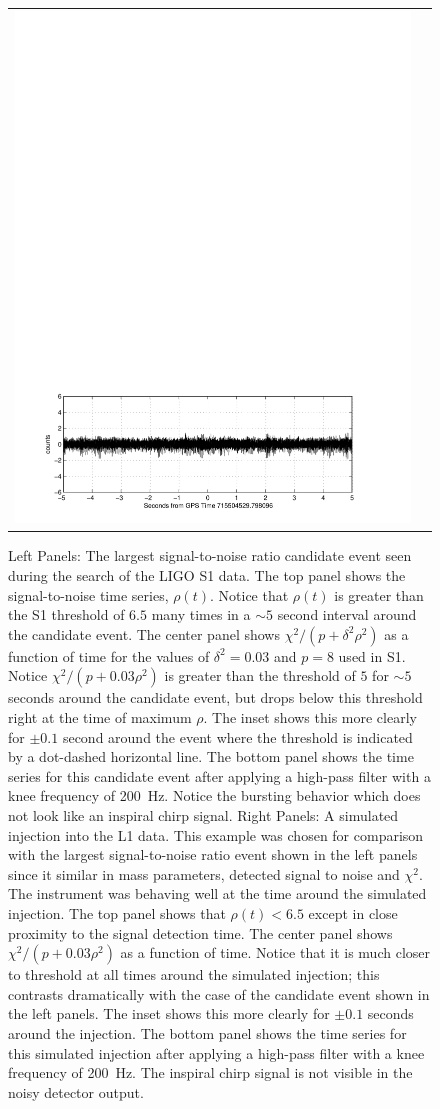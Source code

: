 \begin{figure}[p]
\begin{center}
\begin{tabular}{cc}
\includegraphics[width=0.475\linewidth]{figures/pipeline/injection-ts}
\end{tabular}
\end{center}
\caption[Largest Inspiral Trigger Seen in the S1 Analysis]{
Left Panels: The largest signal-to-noise ratio candidate event seen during the
search of the LIGO S1 data. The top panel shows the signal-to-noise time
series, $\rho(t)$.  Notice that $\rho(t)$ is greater than the S1 threshold of
$6.5$ many times in a  $\sim 5$ second interval around the candidate event.
The center panel shows $\chi^2/ (p+ \delta^2 \rho^2)$ as a function of time
for the values of $\delta^2 = 0.03$ and $p = 8$ used in S1.  Notice $\chi^2 /
(p+ 0.03 \rho^2)$ is greater than the threshold of $5$ for $\sim 5$ seconds
around the candidate event,  but drops below this threshold right at the time
of maximum $\rho$.  The inset shows this more clearly for $\pm 0.1$ second
around the event where the threshold is indicated by a dot-dashed horizontal
line.  The bottom panel shows the time series for this candidate event after
applying a high-pass filter with a knee frequency of 200~Hz.  Notice the
bursting behavior which does not look like an inspiral chirp signal.  \break
Right Panels: A simulated injection into the L1 data.  This example was chosen
for comparison with the largest signal-to-noise ratio event shown in the left
panels since it similar in mass parameters, detected signal to noise and
$\chi^2$.   The instrument was behaving well at the time around the simulated
injection.  The top panel shows that $\rho(t) < 6.5$ except in close proximity
to the signal detection time.  The center panel shows $\chi^2/ (p+ 0.03
\rho^2)$ as a function of time.  Notice that it is much closer to threshold at
all times around the simulated injection; this contrasts dramatically with the
case of the candidate event shown in the left panels.  The inset shows this
more clearly for $\pm 0.1$ seconds around the injection.  The bottom panel
shows the time series for this simulated injection after applying a high-pass
filter with a knee frequency of 200~Hz.  The inspiral chirp signal is not
visible in the noisy detector output.
}
\end{figure}

